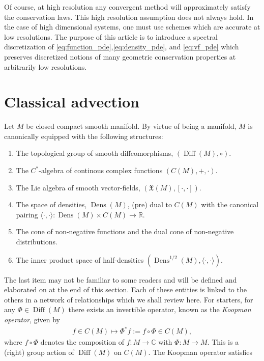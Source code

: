 \documentclass[12pt]{amsart}
\newcommand{\R}{\ensuremath{\mathbb{R}}}
\DeclareMathOperator{\Diff}{Diff}
\DeclareMathOperator{\Dens}{Dens}
\begin{document}
Of course, at high resolution any convergent method will approximately satisfy the conservation laws.
This high resolution assumption does not always hold.
In the case of high dimensional systems, one must use schemes which are accurate at low resolutions.
The purpose of this article is to introduce a spectral discretization of \eqref{eq:function_pde},\eqref{eq:density_pde}, and \eqref{eq:vf_pde}
which preserves discretized notions of many geometric conservation properties at arbitrarily low resolutions.

\section{Classical advection}
\label{sec:classical}
Let $M$ be closed compact smooth manifold.
By virtue of being a manifold, $M$ is canonically equipped with the following structures:
\begin{enumerate}
	\item The topological group of smooth diffeomorphisms, $(\Diff(M), \circ)$.
	\item The $C^*$-algebra of continous complex functions $(C(M), + , \cdot)$.
	\item The Lie algebra of smooth vector-fields, $(\mathfrak{X}(M) , [ \cdot , \cdot ])$.
	\item The space of densities, $\Dens(M)$, (pre) dual to $C(M)$
	with the canonical pairing $\langle \cdot , \cdot \rangle : \Dens(M) \times C(M) \to \R$.
	\item The cone of non-negative functions and the dual cone of non-negative distributions.
	\item The inner product space of half-densities $(\Dens^{1/2}(M), \langle \cdot , \cdot \rangle)$.
\end{enumerate}
The last item may not be familiar to some readers and will be defined and elaborated on at the end of this section.
Each of these entities is linked to the others in a network of relationships
which we shall review here.
For starters, for any $\Phi \in \Diff(M)$ there exists an invertible operator, known as the \emph{Koopman operator}, given by
\begin{align*}
	f \in C(M) \mapsto \Phi^* f := f \circ \Phi \in C(M),
\end{align*}
where $f \circ \Phi$ denotes the composition of $f:M \to \mathbb{C}$ with $\Phi:M \to M$.
This is a (right) group action of $\Diff(M)$ on $C(M)$.
The Koopman operator satisfies
\end{document}
